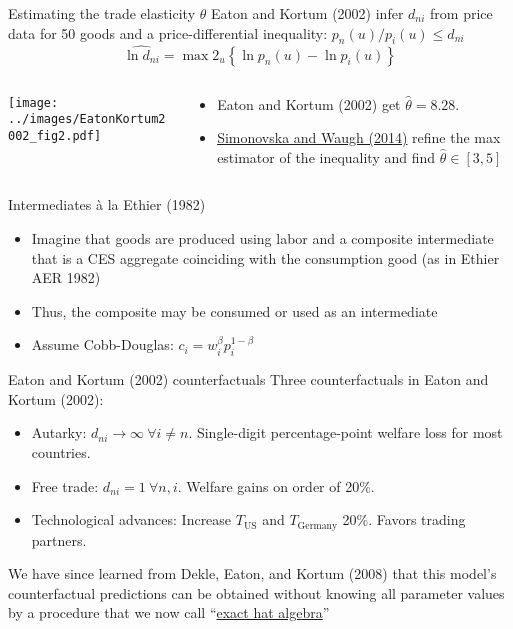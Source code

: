 \documentclass[10pt,notes=hide]{beamer}
\begin{document}
\begin{frame}{Estimating the trade elasticity $\theta$}
Eaton and Kortum (2002) infer $d_{ni}$ from price data for 50 goods and a price-differential inequality:
$%
{p_{n}(u)} / {p_{i}(u)}\leq d_{ni} 
$%
\begin{equation*}
\widehat{\ln d_{ni}}
=
\max2_{u}\left\{ \ln p_{n}(u) -\ln p_{i}(u) \right\}
\end{equation*}
\begin{columns}
\begin{column}{.6\textwidth}
\texttt{[image: ../images/EatonKortum2002\_fig2.pdf]}
\end{column}
\begin{column}{.38\textwidth}
\begin{itemize}
\item Eaton and Kortum (2002) get $\hat{\theta} =8.28$.
\item \href{https://ideas.repec.org/a/eee/inecon/v92y2014i1p34-50.html}{Simonovska and Waugh (2014)} refine the max estimator of the inequality and find $\hat{\theta} \in \left[3,5
\right]$
\end{itemize}
\end{column}
\end{columns}
\end{frame}
\begin{frame}{Intermediates \`{a} la Ethier (1982)}
\begin{itemize}
	\item Imagine that goods are produced using labor and a composite intermediate that is a CES aggregate coinciding with the consumption good (as in Ethier AER 1982)
	\item Thus, the composite may be consumed or used as an intermediate
	\item Assume Cobb-Douglas: $c_i = w_i^\beta p_i^{1-\beta}$
\end{itemize}
\end{frame}
\begin{frame}{Eaton and Kortum (2002) counterfactuals}
Three counterfactuals in Eaton and Kortum (2002):
\begin{itemize}
	\item Autarky: $d_{ni} \to \infty \ \forall i\neq n$. Single-digit percentage-point welfare loss for most countries.
	\item Free trade: $d_{ni}=1 \ \forall n,i$. Welfare gains on order of 20\%.
	\item Technological advances: Increase $T_{\text{US}}$ and  $T_{\text{Germany}}$ 20\%. Favors trading partners.
\end{itemize}
We have since learned from Dekle, Eaton, and Kortum (2008) that this model's counterfactual predictions can be obtained without knowing all parameter values by a procedure that we now call ``\href{https://tradediversion.net/2018/05/07/on-hat-algebra/}{exact hat algebra}''
\end{frame}
\end{document}
